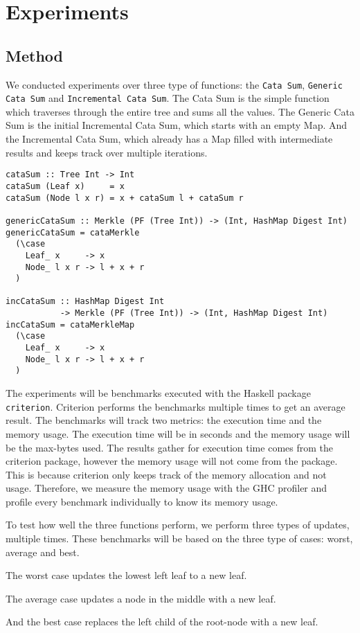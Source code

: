 \chapter{Experiments}

\section{Method}

We conducted experiments over three type of functions: the \texttt{Cata Sum}, \texttt{Generic Cata Sum} and \texttt{Incremental Cata Sum}. The Cata Sum is the simple function which traverses through the entire tree and sums all the values. The Generic Cata Sum is the initial Incremental Cata Sum, which starts with an empty Map. And the Incremental Cata Sum, which already has a Map filled with intermediate results and keeps track over multiple iterations.

\begin{verbatim}
cataSum :: Tree Int -> Int
cataSum (Leaf x)     = x
cataSum (Node l x r) = x + cataSum l + cataSum r

genericCataSum :: Merkle (PF (Tree Int)) -> (Int, HashMap Digest Int)
genericCataSum = cataMerkle
  (\case
    Leaf_ x     -> x
    Node_ l x r -> l + x + r
  )

incCataSum :: HashMap Digest Int 
           -> Merkle (PF (Tree Int)) -> (Int, HashMap Digest Int)
incCataSum = cataMerkleMap
  (\case
    Leaf_ x     -> x
    Node_ l x r -> l + x + r
  )
\end{verbatim}

The experiments will be benchmarks executed with the Haskell package \texttt{criterion}\cite{hackage2022criterion}. Criterion performs the benchmarks multiple times to get an average result. The benchmarks will track two metrics: the execution time and the memory usage. The execution time will be in seconds and the memory usage will be the max-bytes used. The results gather for execution time comes from the criterion package, however the memory usage will not come from the package. This is because criterion only keeps track of the memory allocation and not usage. Therefore, we measure the memory usage with the GHC profiler\cite*{ghc2022memoryprofiling} and profile every benchmark individually to know its memory usage.

To test how well the three functions perform, we perform three types of updates, multiple times. These benchmarks will be based on the three type of cases: worst, average and best.
\begin{enumerate*}[label=(\arabic*)]
  \item The worst case updates the lowest left leaf to a new leaf.
  \item The average case updates a node in the middle with a new leaf.
  \item And the best case replaces the left child of the root-node with a new leaf.
\end{enumerate*}

